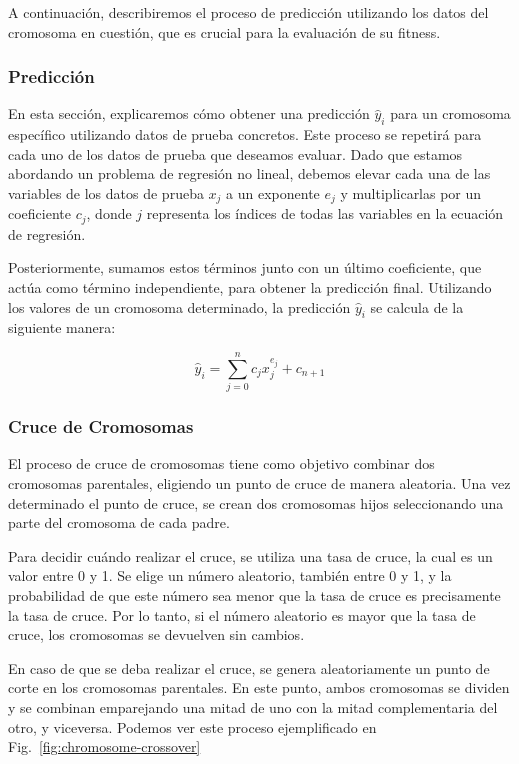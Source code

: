 \documentclass[conference,a4paper]{IEEEtran}
\def\figurename{Fig.}
\begin{document}
A continuación, describiremos el proceso de predicción utilizando los datos del cromosoma en cuestión, que es crucial para la evaluación de su fitness.

\subsubsection{Predicción}
En esta sección, explicaremos cómo obtener una predicción \(\hat{y}_i\) para un cromosoma específico utilizando datos de prueba concretos. Este proceso se repetirá para cada uno de los datos de prueba que deseamos evaluar. Dado que estamos abordando un problema de regresión no lineal, debemos elevar cada una de las variables de los datos de prueba \(x_j\) a un exponente \(e_j\) y multiplicarlas por un coeficiente \(c_j\), donde \(j\) representa los índices de todas las variables en la ecuación de regresión. 

Posteriormente, sumamos estos términos junto con un último coeficiente, que actúa como término independiente, para obtener la predicción final. Utilizando los valores de un cromosoma determinado, la predicción \(\hat{y}_i\) se calcula de la siguiente manera:

\[
\hat{y}_i = \sum_{j=0}^{n} c_j x_j^{e_j} + c_{n+1}
\]


\subsubsection{Cruce de Cromosomas}
El proceso de cruce de cromosomas tiene como objetivo combinar dos cromosomas parentales, eligiendo un punto de cruce de manera aleatoria. Una vez determinado el punto de cruce, se crean dos cromosomas hijos seleccionando una parte del cromosoma de cada padre. 

Para decidir cuándo realizar el cruce, se utiliza una tasa de cruce, la cual es un valor entre 0 y 1. Se elige un número aleatorio, también entre 0 y 1, y la probabilidad de que este número sea menor que la tasa de cruce es precisamente la tasa de cruce. Por lo tanto, si el número aleatorio es mayor que la tasa de cruce, los cromosomas se devuelven sin cambios. 

En caso de que se deba realizar el cruce, se genera aleatoriamente un punto de corte en los cromosomas parentales. En este punto, ambos cromosomas se dividen y se combinan emparejando una mitad de uno con la mitad complementaria del otro, y viceversa. Podemos ver este proceso ejemplificado en \figurename~\ref{fig:chromosome-crossover}
\end{document}
